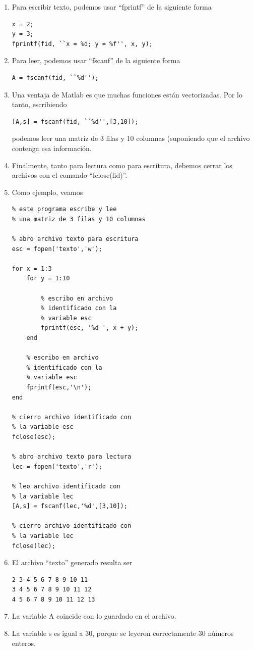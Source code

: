 \begin{enumerate}
\item Para escribir texto, podemos usar ``fprintf'' de la siguiente
  forma
\begin{verbatim}
x = 2;
y = 3;
fprintf(fid, ``x = %d; y = %f'', x, y);
\end{verbatim}

\item Para leer, podemos usar ``fscanf'' de la siguiente
  forma
\begin{verbatim}
A = fscanf(fid, ``%d'');
\end{verbatim}

\item Una ventaja de Matlab es que muchas funciones est\'{a}n
  vectorizadas. Por lo tanto, escribiendo
\begin{verbatim}
[A,s] = fscanf(fid, ``%d'',[3,10]);
\end{verbatim}
podemos leer una matriz de 3 filas y 10 columnas (suponiendo que el
archivo contenga esa informaci\'{o}n.

\item Finalmente, tanto para lectura como para escritura, debemos
  cerrar los archivos con el comando ``fclose(fid)''.

\item Como ejemplo, veamos
\begin{verbatim}
% este programa escribe y lee 
% una matriz de 3 filas y 10 columnas

% abro archivo texto para escritura
esc = fopen('texto','w');

for x = 1:3
    for y = 1:10

        % escribo en archivo 
        % identificado con la
        % variable esc
        fprintf(esc, '%d ', x + y);
    end

    % escribo en archivo 
    % identificado con la
    % variable esc
    fprintf(esc,'\n');
end

% cierro archivo identificado con 
% la variable esc
fclose(esc);

% abro archivo texto para lectura
lec = fopen('texto','r');

% leo archivo identificado con 
% la variable lec
[A,s] = fscanf(lec,'%d',[3,10]);

% cierro archivo identificado con 
% la variable lec
fclose(lec);
\end{verbatim}

\item El archivo ``texto'' generado resulta ser
\begin{verbatim}
2 3 4 5 6 7 8 9 10 11 
3 4 5 6 7 8 9 10 11 12 
4 5 6 7 8 9 10 11 12 13 
\end{verbatim}

\item La variable A coincide con lo guardado en el archivo.

\item La variable s es igual a $30$, porque se leyeron correctamente
  $30$ n\'{u}meros enteros.

\end{enumerate}

